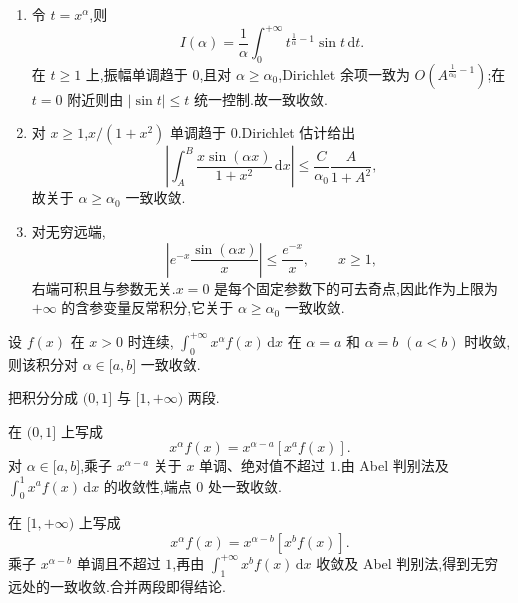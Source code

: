 \begin{solution}
    \begin{enumerate}
        \item 令 $t=x^\alpha$,则
              \[
                  I(\alpha)=\dfrac{1}{\alpha}\int_0^{+\infty}t^{\frac{1}{\alpha}-1}\sin t\,\mathrm{d}t.
              \]
              在 $t\geq1$ 上,振幅单调趋于 $0$,且对 $\alpha\geq\alpha_0$,Dirichlet 余项一致为
              $O\left(A^{\frac{1}{\alpha_0}-1}\right)$;在 $t=0$ 附近则由 $|\sin t|\leq t$ 统一控制.故一致收敛.
        \item 对 $x\geq1$,$x/(1+x^2)$ 单调趋于 $0$.Dirichlet 估计给出
              \[
                  \left|\int_A^B\dfrac{x\sin(\alpha x)}{1+x^2}\,\mathrm{d}x\right|
                  \leq\dfrac{C}{\alpha_0}\dfrac{A}{1+A^2},
              \]
              故关于 $\alpha\geq\alpha_0$ 一致收敛.
        \item 对无穷远端,
              \[
                  \left|e^{-x}\dfrac{\sin(\alpha x)}{x}\right|\leq\dfrac{e^{-x}}{x},
                  \qquad x\geq1,
              \]
              右端可积且与参数无关.$x=0$ 是每个固定参数下的可去奇点,因此作为上限为 $+\infty$ 的含参变量反常积分,它关于 $\alpha\geq\alpha_0$ 一致收敛.
    \end{enumerate}
\end{solution}

\begin{example}
    设 $f(x)$ 在 $x>0$ 时连续, $\displaystyle\int_0^{+\infty}x^\alpha f(x)\,\mathrm{d}x$ 在 $\alpha=a$ 和 $\alpha=b$ $(a<b)$ 时收敛, 则该积分对 $\alpha\in\lbrack a,b\rbrack$ 一致收敛.
\end{example}
\exampleblank

\begin{solution}
    把积分分成 $(0,1\rbrack$ 与 $\lbrack1,+\infty)$ 两段.

    在 $(0,1\rbrack$ 上写成
    \[
        x^\alpha f(x)=x^{\alpha-a}[x^af(x)].
    \]
    对 $\alpha\in\lbrack a,b\rbrack$,乘子 $x^{\alpha-a}$ 关于 $x$ 单调、绝对值不超过 $1$.由 Abel 判别法及
    $\displaystyle\int_0^1x^af(x)\,\mathrm{d}x$ 的收敛性,端点 $0$ 处一致收敛.

    在 $\lbrack1,+\infty)$ 上写成
    \[
        x^\alpha f(x)=x^{\alpha-b}[x^bf(x)].
    \]
    乘子 $x^{\alpha-b}$ 单调且不超过 $1$,再由
    $\displaystyle\int_1^{+\infty}x^bf(x)\,\mathrm{d}x$ 收敛及 Abel 判别法,得到无穷远处的一致收敛.合并两段即得结论.
\end{solution}



